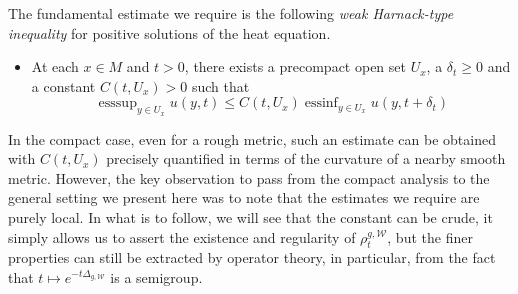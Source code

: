 \documentclass[AMS,STIX1COL]{WileyNJD-v2}
\numberwithin{equation}{section}
\renewcommand{\~}{\tilde}
\renewcommand{\-}{\bar}
\newcommand{\8}{\infty}
\newcommand{\cW}{\mathcal{W}}
\DeclareMathOperator{\esssup}{esssup}
\DeclareMathOperator{\essinf}{essinf}
\newcommand{\hk}{\rho}
\begin{document}
The fundamental estimate we
require is the following \emph{weak Harnack-type inequality} for positive solutions of the heat
equation.
\begin{itemize}
\item[] At each $x \in M$ and $t > 0$, there exists a precompact
open set $U_x$, a $\delta_t \geq 0$ and a constant $C(t, U_x)  > 0$ such that
\begin{equation}
\tag{H}
\label{eq:Harnack}
\esssup_{y \in U_x} u(y,t)
	\leq C(t, U_x)  \essinf_{y \in U_x} u(y, t + \delta_t)
\end{equation}
\end{itemize}

In the compact case, even for a
rough metric, such an estimate can be
obtained with $C(t,U_x)$ precisely quantified
in terms of the curvature of a nearby smooth metric.
However, the key observation to pass from the compact analysis
to the general setting we present here was to note that
the estimates we require are purely local. In 
what is to follow, we will see that the constant can be
crude, it simply allows us to assert the existence and regularity
of $\hk^{g,\cW}_t$, but the finer properties can still 
be extracted by operator theory, in particular, from the 
fact that $t \mapsto e^{-t\Delta_{g,\cW}}$ is a semigroup.
\end{document}
